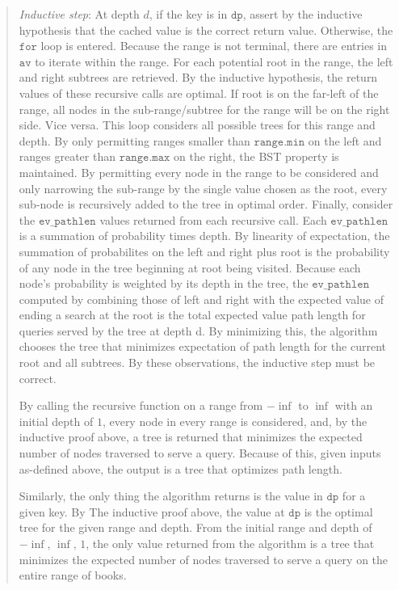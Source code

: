 \documentclass[11pt]{article}
\newcommand{\code}[1]{$\texttt{#1}$}
\begin{document}
\begin{enumerate}
\begin{quote}
\medskip
\textit{Inductive step}: At depth $d$, if the key is in \code{dp}, assert by the inductive hypothesis that the cached value is the correct return value. Otherwise, the \code{for} loop is entered. Because the range is not terminal, there are entries in \code{av} to iterate within the range. For each potential root in the range, the left and right subtrees are retrieved. By the inductive hypothesis, the return values of these recursive calls are optimal. If root is on the far-left of the range, all nodes in the sub-range/subtree for the range will be on the right side. Vice versa. This loop considers all possible trees for this range and depth. By only permitting ranges smaller than \code{range.min} on the left and ranges greater than \code{range.max} on the right, the BST property is maintained. By permitting every node in the range to be considered and only narrowing the sub-range by the single value chosen as the root, every sub-node is recursively added to the tree in optimal order. Finally, consider the \code{ev\_pathlen} values returned from each recursive call. Each \code{ev\_pathlen} is a summation of probability times depth. By linearity of expectation, the summation of probabilites on the left and right plus root is the probability of any node in the tree beginning at root being visited. Because each node's probability is weighted by its depth in the tree, the \code{ev\_pathlen} computed by combining those of left and right with the expected value of ending a search at the root is the total expected value path length for queries served by the tree at depth d. By minimizing this, the algorithm chooses the tree that minimizes expectation of path length for the current root and all subtrees. By these observations, the inductive step must be correct.

\medskip
By calling the recursive function on a range from $-\inf$ to $\inf$ with an initial depth of $1$, every node in every range is considered, and, by the inductive proof above, a tree is returned that minimizes the expected number of nodes traversed to serve a query. Because of this, given inputs as-defined above, the output is a tree that optimizes path length. 

\medskip
Similarly, the only thing the algorithm returns is the value in \code{dp} for a given key. By The inductive proof above, the value at \code{dp} is the optimal tree for the given range and depth. From the initial range and depth of $-\inf$, $\inf$, $1$, the only value returned from the algorithm is a tree that minimizes
the expected number of nodes traversed to serve a query on the entire range of books.


\end{quote}
\end{enumerate}
\end{document}
